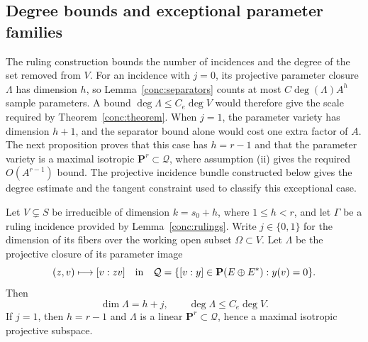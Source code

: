 \subsection{Degree bounds and exceptional parameter families}
\label{conc:deg-section}

The ruling construction bounds the number of incidences and the degree
of the set removed from \(V\). For an incidence with \(j=0\), its
projective parameter closure \(\Lambda\) has dimension \(h\), so
Lemma~\ref{conc:separators} counts at
most \(C\deg(\Lambda)A^h\) sample parameters. A bound
\(\deg\Lambda\le C_e\deg V\) would therefore give the scale required
by Theorem~\ref{conc:theorem}. When \(j=1\), the parameter variety has
dimension \(h+1\), and the separator bound alone would cost one extra
factor of \(A\). The next proposition proves that this case has
\(h=r-1\) and that the parameter variety is a maximal isotropic
\(\mathbf P^r\subset\mathcal Q\), where assumption (ii) gives the
required \(O(A^{r-1})\) bound. The projective incidence bundle
constructed below gives the degree estimate and the tangent constraint
used to classify this exceptional case.

\begin{proposition}
\label{conc:degree}
Let \(V\subsetneq S\) be irreducible of dimension \(k=s_0+h\), where
\(1\le h<r\), and let \(\Gamma\) be a ruling incidence provided by
Lemma~\ref{conc:rulings}.  Write \(j\in\{0,1\}\) for the dimension
of its fibers over the working open subset \(\Omega\subset V\).
Let \(\Lambda\) be the projective closure of its parameter image
\[
 (z,v)\longmapsto[v:zv]
 \quad\hbox{in}\quad
 \mathcal Q=\{[v:y]\in\mathbf{P}(E\oplus E^*):y(v)=0\}.
\]
Then
\[
 \dim\Lambda=h+j,
 \qquad \deg\Lambda\le C_e\deg V.
\]
If \(j=1\), then \(h=r-1\) and \(\Lambda\) is a linear
\(\mathbf{P}^r\subset\mathcal Q\), hence a maximal isotropic
projective subspace.
\end{proposition}


